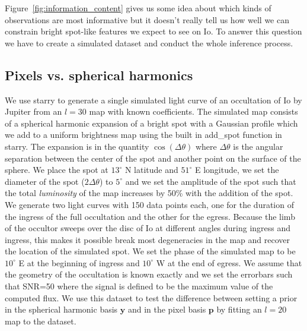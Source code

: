 \documentclass[linenumbers,modern]{aastex62}
\begin{document}
Figure~\ref{fig:information_content} gives us some idea about which kinds of observations are most informative but it doesn't really tell us how well we can constrain bright spot-like features we expect to see on Io.
To answer this question we have to create a simulated dataset and conduct the whole inference process.

\subsection{Pixels vs. spherical harmonics}
\label{ssec:pixels_vs_harmonics}
We use \textsf{starry} to generate a single simulated light curve of an occultation of Io by Jupiter from an $l=30$ map with known coefficients.
The simulated map consists of a spherical harmonic expansion of a bright spot with a Gaussian profile which we add to a uniform brightness map using the built in \textsf{add\_spot} function in \textsf{starry}.
The expansion is in the quantity $\cos(\Delta\theta)$ where $\Delta\theta$ is the angular separation between the center of the spot and another point on the surface of the sphere. 
We place the spot at $13^\circ$ N latitude and $51^\circ$ E longitude, we set the diameter of the spot ($2\Delta\theta$) to $5^\circ$ and we set the amplitude of the spot such that the total \emph{luminosity} of the map increases by 50\% with the addition of the spot.
We generate two light curves with 150 data points each, one for the duration of the ingress of the full occultation and the other for the egress.
Because the limb of the occultor sweeps over the disc of Io at different angles during ingress and ingress, this makes it possible break most degeneracies in the map and recover the location of the simulated spot.
We set the phase of the simulated map to be $10^\circ$ E at the beginning of ingress and $10^\circ$ W at the end of egress.
We assume that the geometry of the occultation is known exactly and we set the errorbars such that SNR=50 where the signal is defined to be the maximum value of the computed flux.
    We use this dataset to test the difference between setting a prior in the spherical harmonic basis $\mathbf{y}$ and in the pixel basis $\mathbf{p}$ by fitting an $l=20$ map to the dataset.
\end{document}
